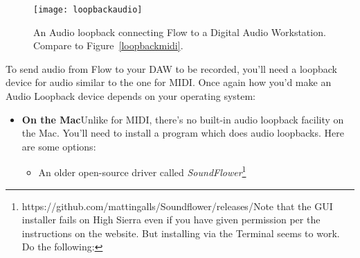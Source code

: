 \documentclass{article}
\newcommand\name{Flow}
\begin{document}
\begin{wrapfigure}{r}{3in}
\begin{center}\vspace{-2em}\texttt{[image: loopbackaudio]}\end{center}
\vspace{-1em}
\caption{An Audio loopback connecting {\name} to a Digital Audio Workstation.  Compare to Figure~\ref{loopbackmidi}.}\label{loopbackaudio}
\end{wrapfigure}

To send audio from Flow to your DAW to be recorded, you'll need a loopback device for audio similar to the one for MIDI.   Once again how you'd make an Audio Loopback device depends on your operating system:

\begin{itemize}
\item {\bf On the Mac}\quad Unlike for MIDI, there's no built-in audio loopback facility on the Mac.  You'll need to install a program which does audio loopbacks.  Here are some options:
\begin{itemize}
\item An older open-source driver called {\it SoundFlower}\footnote{https:/\!/github.com/mattingalls/Soundflower/releases/\qquad Note that the GUI installer fails on High Sierra even if you have given permission per the instructions on the website.  But installing via the Terminal seems to work.  Do the following:

}
\end{itemize}
\end{itemize}
\end{document}
